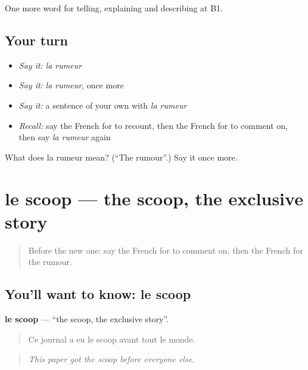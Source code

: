 \begin{grammarlens}[title={What you've built}]
One more word for telling, explaining and describing at B1.
\end{grammarlens}

\subsection*{Your turn}
\begin{itemize}
\raggedright
  \item \emph{Say it:} \emph{la rumeur}
  \item \emph{Say it:} \emph{la rumeur}, once more
  \item \emph{Say it:} a sentence of your own with \emph{la rumeur}
  \item \emph{Recall:} say the French for to recount, then the French for to comment on, then say \emph{la rumeur} again
\end{itemize}

\begin{tcolorbox}[breakable,colback=teal!4,colframe=teal!35!black,title={Before you move on}]
What does la rumeur mean? (\textquotedblleft{}The rumour\textquotedblright{}.) Say it once more.
\end{tcolorbox}
\section[le scoop]{le scoop — the scoop, the exclusive story}

\label{lesson:FR-C285-scoop}



\begin{quote}
Before the new one: say the French for to comment on, then the French for the rumour.
\end{quote}

\subsection*{You'll want to know: le scoop}
\textbf{le scoop} — \textquotedblleft{}the scoop, the exclusive story\textquotedblright{}.

\begin{quote}
Ce journal a eu le scoop avant tout le monde.
\end{quote}

\begin{quote}
\emph{This paper got the scoop before everyone else.}
\end{quote}

